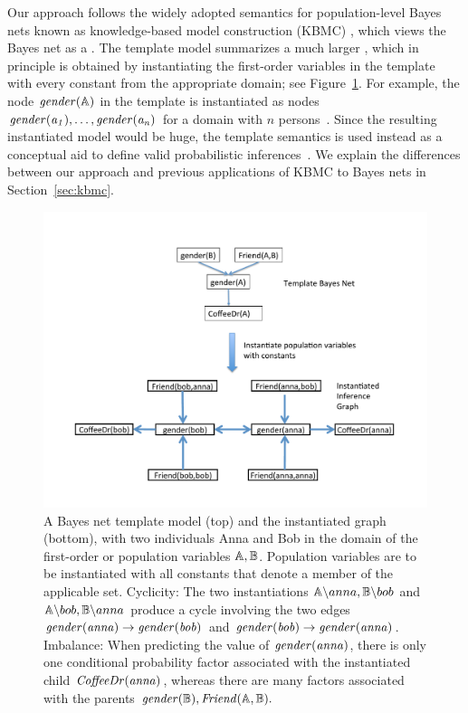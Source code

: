 \documentclass[twoside,11pt]{article}
\begin{document}
Our approach follows the widely adopted semantics for population-level Bayes nets known as knowledge-based model construction (KBMC) \cite{Ngo1997,Koller1997a,Wellman1992}, which views the Bayes net as a . The template model summarizes a much larger , which in principle is obtained by instantiating the first-order variables in the template with every constant from the appropriate domain; see Figure~\ref{fig:recurse-bn}. For example, the node $\it{gender}(\mathbb{A})$ in the template is instantiated as nodes $\it{gender}(a_{1}),\ldots,\it{gender}(a_{n})$ for a domain with $n$ persons~\cite{Neville2007,Getoor2007c,Poole2003,Taskar2002,Domingos2009}. Since the resulting instantiated model would be huge, the template semantics is used instead as a conceptual aid to define valid probabilistic inferences~\cite{getoor-intro}.  
We explain the differences between our approach and previous applications of KBMC to Bayes nets in Section~\ref{sec:kbmc}. 


\begin{figure}[htbp]
\vspace{-4.3cm}
\begin{center}
\includegraphics[width = 1 \textwidth]{figures/recurse-bn}
\caption{A Bayes net template model (top) and the instantiated graph (bottom), with two individuals Anna and Bob in the domain of the first-order or population variables $\mathbb{A},\mathbb{B}$. Population variables are to be instantiated with all constants that denote a member of the applicable set. 
 Cyclicity: The two instantiations $\mathbb{A}\backslash anna,\mathbb{B} \backslash bob$ and $\mathbb{A}\backslash bob,\mathbb{B}\backslash anna$ produce a cycle involving the two  edges $\it{gender}(anna) \rightarrow \it{gender}(bob)$ and $\it{gender}(bob) \rightarrow \it{gender}(anna)$. Imbalance: When predicting the value of $\it{gender}(anna)$, there is only one conditional probability factor associated with the instantiated child $\it{CoffeeDr}(anna)$, whereas there are many factors associated with the parents  $ \it{gender}(\mathbb{B}),\it{Friend}(\mathbb{A},\mathbb{B}).$
\label{fig:recurse-bn}}
\end{center}
\end{figure}
\end{document}
